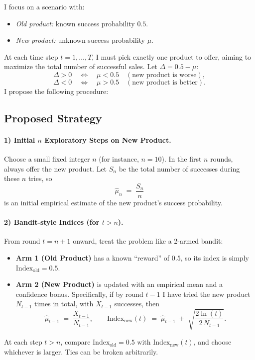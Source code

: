 I focus on a scenario with:
\begin{itemize}
  \item \emph{Old product:} known success probability $0.5$.
  \item \emph{New product:} unknown success probability $\mu$.
\end{itemize}
At each time step $t=1,\ldots,T$, I must pick exactly one product to offer, aiming to maximize the total number of successful sales. Let $\Delta = 0.5 - \mu$:
\[
\Delta > 0 \quad \Longleftrightarrow \quad \mu < 0.5 \quad (\text{new product is worse}),
\]
\[
\Delta < 0 \quad \Longleftrightarrow \quad \mu > 0.5 \quad (\text{new product is better}).
\]
I propose the following procedure:

\subsection*{Proposed Strategy}

\paragraph{1) Initial $n$ Exploratory Steps on New Product.}
Choose a small fixed integer $n$ (for instance, $n=10$). In the first $n$ rounds, always offer the new product. Let $S_n$ be the total number of successes during these $n$ tries, so
\[
\hat{\mu}_n \;=\; \frac{S_n}{n}
\]
is an initial empirical estimate of the new product's success probability.

\paragraph{2) Bandit-style Indices (for $t>n$).}
From round $t=n+1$ onward, treat the problem like a 2-armed bandit:
\begin{itemize}
    \item \textbf{Arm 1 (Old Product)} has a known ``reward'' of $0.5$, so its index is simply $\text{Index}_{\text{old}} = 0.5$.
    \item \textbf{Arm 2 (New Product)} is updated with an empirical mean and a confidence bonus. Specifically, if by round $t-1$ I have tried the new product $N_{t-1}$ times in total, with $X_{t-1}$ successes, then
    \[
    \hat{\mu}_{t-1} \;=\; \frac{X_{t-1}}{N_{t-1}}, 
    \qquad
    \text{Index}_{\text{new}}(t) 
    \;=\;
    \hat{\mu}_{t-1}
    \;+\;
    \sqrt{\frac{2 \ln (t)}{2\,N_{t-1}}}.
    \]
\end{itemize}
At each step $t>n$, compare $\text{Index}_{\text{old}} = 0.5$ with $\text{Index}_{\text{new}}(t)$, and choose whichever is larger. Ties can be broken arbitrarily.

